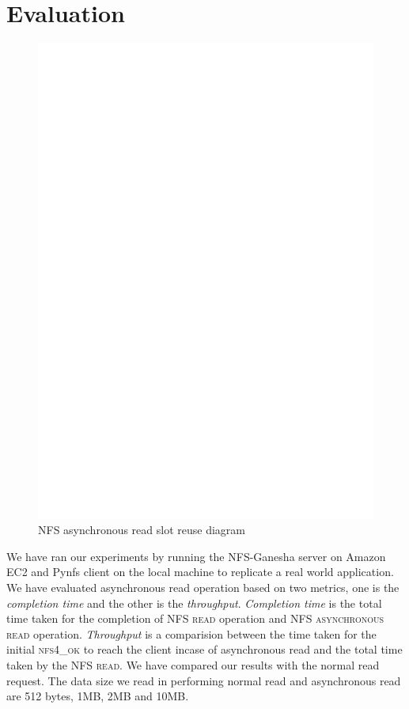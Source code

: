 \section{Evaluation}
\label{sec:Evaluation}

\begin{figure}
\centering
\includegraphics[scale=0.7]{figures/Slotreuse.eps}
\caption{NFS asynchronous read slot reuse diagram}
\label{fig:NFSSlotreuse}
\end{figure}


	We have ran our experiments by running the NFS-Ganesha server on Amazon EC2 and Pynfs client on the local machine to replicate a real world application.  We have evaluated asynchronous read operation based on two metrics, one is the \textit{completion time} and the other is the \textit{throughput}. \textit{Completion time} is the total time taken for the completion of \textsc{NFS read} operation and \textsc{NFS asynchronous read} operation. \textit{Throughput} is a comparision between the time taken for the initial \textsc{nfs4\_ok} to reach the client incase of asynchronous read and the total time taken by the \textsc{NFS read}. We have compared our results with the normal read request. The data size we read in performing normal read and asynchronous read are 512 bytes, 1MB, 2MB and 10MB. 


